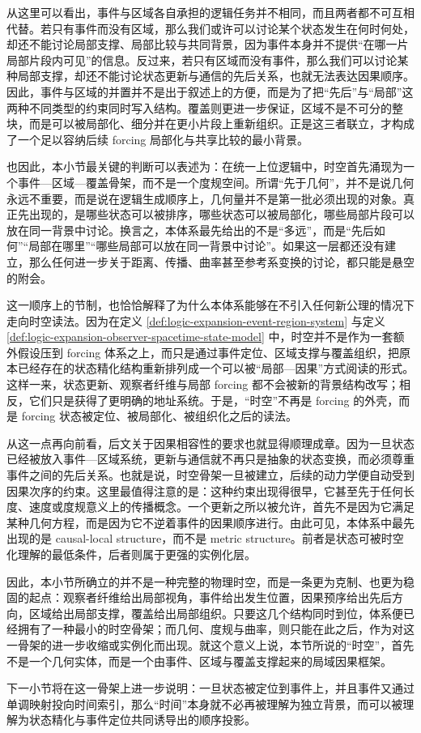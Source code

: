 从这里可以看出，事件与区域各自承担的逻辑任务并不相同，而且两者都不可互相代替。若只有事件而没有区域，那么我们或许可以讨论某个状态发生在何时何处，却还不能讨论局部支撑、局部比较与共同背景，因为事件本身并不提供“在哪一片局部片段内可见”的信息。反过来，若只有区域而没有事件，那么我们可以讨论某种局部支撑，却还不能讨论状态更新与通信的先后关系，也就无法表达因果顺序。因此，事件与区域的并置并不是出于叙述上的方便，而是为了把“先后”与“局部”这两种不同类型的约束同时写入结构。覆盖则更进一步保证，区域不是不可分的整块，而是可以被局部化、细分并在更小片段上重新组织。正是这三者联立，才构成了一个足以容纳后续 forcing 局部化与共享比较的最小背景。

也因此，本小节最关键的判断可以表述为：在统一上位逻辑中，时空首先涌现为一个事件—区域—覆盖骨架，而不是一个度规空间。所谓“先于几何”，并不是说几何永远不重要，而是说在逻辑生成顺序上，几何量并不是第一批必须出现的对象。真正先出现的，是哪些状态可以被排序，哪些状态可以被局部化，哪些局部片段可以放在同一背景中讨论。换言之，本体系最先给出的不是“多远”，而是“先后如何”“局部在哪里”“哪些局部可以放在同一背景中讨论”。如果这一层都还没有建立，那么任何进一步关于距离、传播、曲率甚至参考系变换的讨论，都只能是悬空的附会。

这一顺序上的节制，也恰恰解释了为什么本体系能够在不引入任何新公理的情况下走向时空读法。因为在定义 \ref{def:logic-expansion-event-region-system} 与定义 \ref{def:logic-expansion-observer-spacetime-state-model} 中，时空并不是作为一套额外假设压到 forcing 体系之上，而只是通过事件定位、区域支撑与覆盖组织，把原本已经存在的状态精化结构重新排列成一个可以被“局部—因果”方式阅读的形式。这样一来，状态更新、观察者纤维与局部 forcing 都不会被新的背景结构改写；相反，它们只是获得了更明确的地址系统。于是，“时空”不再是 forcing 的外壳，而是 forcing 状态被定位、被局部化、被组织化之后的读法。

从这一点再向前看，后文关于因果相容性的要求也就显得顺理成章。因为一旦状态已经被放入事件—区域系统，更新与通信就不再只是抽象的状态变换，而必须尊重事件之间的先后关系。也就是说，时空骨架一旦被建立，后续的动力学便自动受到因果次序的约束。这里最值得注意的是：这种约束出现得很早，它甚至先于任何长度、速度或度规意义上的传播概念。一个更新之所以被允许，首先不是因为它满足某种几何方程，而是因为它不逆着事件的因果顺序进行。由此可见，本体系中最先出现的是 causal-local structure，而不是 metric structure。前者是状态可被时空化理解的最低条件，后者则属于更强的实例化层。

因此，本小节所确立的并不是一种完整的物理时空，而是一条更为克制、也更为稳固的起点：观察者纤维给出局部视角，事件给出发生位置，因果预序给出先后方向，区域给出局部支撑，覆盖给出局部组织。只要这几个结构同时到位，体系便已经拥有了一种最小的时空骨架；而几何、度规与曲率，则只能在此之后，作为对这一骨架的进一步收缩或实例化而出现。就这个意义上说，本节所说的“时空”，首先不是一个几何实体，而是一个由事件、区域与覆盖支撑起来的局域因果框架。

下一小节将在这一骨架上进一步说明：一旦状态被定位到事件上，并且事件又通过单调映射投向时间索引，那么“时间”本身就不必再被理解为独立背景，而可以被理解为状态精化与事件定位共同诱导出的顺序投影。
